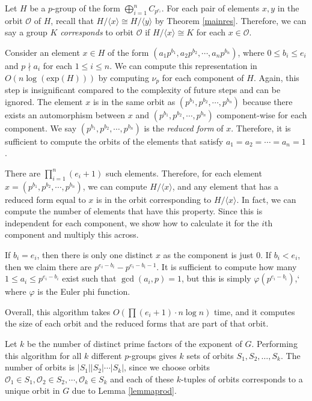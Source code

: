 \documentclass[11pt]{amsart}
\theoremstyle{definition}
\renewcommand{\phi}{\varphi}
\renewcommand{\leq}{\leqslant}
\numberwithin{equation}{section}
\begin{document}
Let $H$ be a $p$-group of the form $
\bigoplus\limits_{i=1}^n C_{p^{e_i}}$. 
For each pair of elements $x, y$ in the orbit $\mathcal O$ of $H$, recall that $H /\langle x \rangle \cong H/\langle y \rangle$ by Theorem \ref{mainres}. Therefore, we can say a group $K$ 
\textit{corresponds} to orbit $\mathcal O$ if $H/\langle x\rangle \cong K$ for each $x\in \mathcal O$.

Consider an element $x \in H$ of the form $(a_1 p^{b_1}, a_2 p^{b_2}, \cdots,a_n  p^{b_n})$, where $0\leq b_i\leq e_i$ and $p \nmid a_i$ for each $1\leq i \leq n$. We can compute this representation in $O(n \log(\text{exp}(H)))$ by computing $\nu_p$ for each component of $H$. Again, this step is insignificant compared to the complexity of future steps and can be ignored. The element $x$ is in the same orbit as $(p^{b_1}, p^{b_2}, \cdots, p^{b_n})$ because there exists an automorphism between $x$ and $(p^{b_1}, p^{b_2}, \cdots, p^{b_n})$ component-wise for each component. We say $(p^{b_1}, p^{b_2}, \cdots, p^{b_n})$ is the \textit{reduced form} of $x$. Therefore, it is sufficient to compute the orbits of the elements that satisfy $a_1=a_2 = \cdots = a_n = 1$. 

There are $\prod_{i=1}^n (e_i+1)$ such elements. Therefore, for each element $x = (p^{b_1}, p^{b_2}, \cdots, p^{b_n})$, we can compute $H/\langle x\rangle$, and any element that has a reduced form equal to $x$ is in the orbit corresponding to $H/\langle x \rangle$. In fact, we can compute the number of elements that have this property. Since this is independent for each component, we show how to calculate it for the $i$th component and multiply this across. 

If $b_i=e_i$, then there is only one distinct $x$ as the component is just 0. If $b_i < e_i$, then we claim there are $p^{e_i-b_i} - p^{e_i-b_i-1}$. It is sufficient to compute how many $1\leq a_i\leq p^{e_i-b_i}$ exist such that $\gcd(a_i,p)=1$, but this is simply $\phi(p^{e_i-b_i})$,` where $\phi$ is the Euler phi function. 

Overall, this algorithm takes $O( \prod (e_i+1) \cdot n \log n)$ time, and it computes the size of each orbit and the reduced forms that are part of that orbit. 

Let $k$ be the number of distinct prime factors of the exponent of $G$. Performing this algorithm for all $k$ different $p$-groups gives $k$ sets of orbits $S_1, S_2, \dots, S_k$. The number of orbits is $|S_1| |S_2| \cdots |S_k|$, since we choose orbits $\mathcal{O}_1 \in S_1, \mathcal{O}_2 \in S_2, \cdots, \mathcal{O}_k\in S_k$ and each of these $k$-tuples of orbits corresponds to a unique orbit in $G$ due to Lemma \ref{lemmaprod}.
\end{document}
